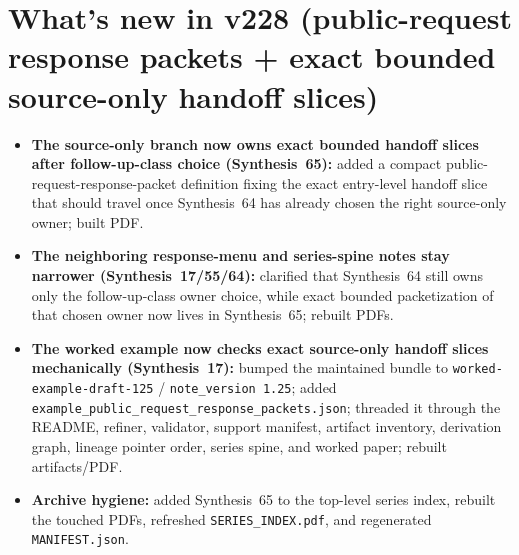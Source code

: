 \documentclass[11pt]{article}
\begin{document}
\section{What's new in v228 (public-request response packets + exact bounded source-only handoff slices)}
\begin{itemize}[leftmargin=*]
\item \textbf{The source-only branch now owns exact bounded handoff slices after follow-up-class choice (Synthesis~65):} added a compact public-request-response-packet definition fixing the exact entry-level handoff slice that should travel once Synthesis~64 has already chosen the right source-only owner; built PDF.
\item \textbf{The neighboring response-menu and series-spine notes stay narrower (Synthesis~17/55/64):} clarified that Synthesis~64 still owns only the follow-up-class owner choice, while exact bounded packetization of that chosen owner now lives in Synthesis~65; rebuilt PDFs.
\item \textbf{The worked example now checks exact source-only handoff slices mechanically (Synthesis~17):} bumped the maintained bundle to \texttt{worked-example-draft-125} / \texttt{note\_version 1.25}; added \texttt{example\_public\_request\_response\_packets.json}; threaded it through the README, refiner, validator, support manifest, artifact inventory, derivation graph, lineage pointer order, series spine, and worked paper; rebuilt artifacts/PDF.
\item \textbf{Archive hygiene:} added Synthesis~65 to the top-level series index, rebuilt the touched PDFs, refreshed \texttt{SERIES\_INDEX.pdf}, and regenerated \texttt{MANIFEST.json}.
\end{itemize}
\end{document}
